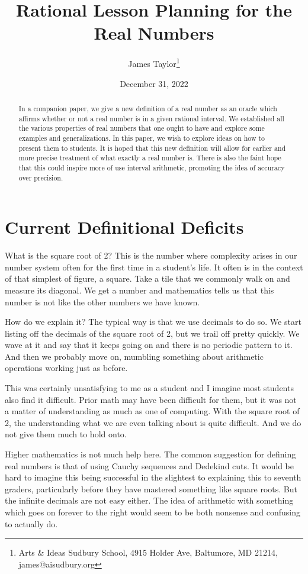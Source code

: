 \documentclass[12pt]{article}
\title{Rational Lesson Planning for the Real Numbers}
\author{
  James Taylor\footnote{Arts \& Ideas Sudbury School, 4915 Holder Ave, Baltumore, MD 21214, james@aisudbury.org}
}
\date{December 31, 2022}
\theoremstyle{remark}
\begin{document}
\maketitle
\begin{abstract}
In a companion paper, we give a new definition of a real number as an oracle which affirms whether or not a real number is in a given rational interval. We established all the various properties of real numbers that one ought to have and explore some examples and generalizations. In this paper, we wish to explore ideas on how to present them to students. It is hoped that this new definition will allow for earlier and more precise treatment of what exactly a real number is. There is also the faint hope that this could inspire more of use interval arithmetic, promoting the idea of accuracy over precision. 
\end{abstract}

\tableofcontents

\section{Current Definitional Deficits}

What is the square root of 2? This is the number where complexity arises in our number system often for the first time in a student's life. It often is in the context of that simplest of figure, a square. Take a tile that we commonly walk on and measure its diagonal. We get a number and mathematics tells us that this number is not like the other numbers we have known. 

How do we explain it? The typical way is that we use decimals to do so. We start listing off the decimals of the square root of 2, but we trail off pretty quickly. We wave at it and say that it keeps going on and there is no periodic pattern to it. And then we probably move on, mumbling something about arithmetic operations working just as before. 

This was certainly unsatisfying to me as a student and I imagine most students also find it difficult. Prior math may have been difficult for them, but it was not a matter of understanding as much as one of computing. With the square root of 2, the understanding what we are even talking about is quite difficult. And we do not give them much to hold onto. 

Higher mathematics is not much help here. The common suggestion for defining real numbers is that of using Cauchy sequences and Dedekind cuts. It would be hard to imagine this being successful in the slightest to explaining this to seventh graders, particularly before they have mastered something like square roots. But the infinite decimals are not easy either. The idea of arithmetic with something which goes on forever to the right would seem to be both nonsense and confusing to actually do. 
\end{document}
